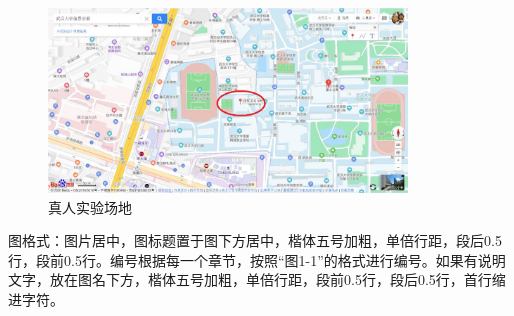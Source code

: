 \begin{figure}[h]
\centering
\includegraphics[width=0.85\textwidth]{figures/fig1.png}
\caption{真人实验场地}
\label{fig:ch1_1}
\flushleft
{}
\end{figure}

{\color{red}图格式：图片居中，图标题置于图下方居中，楷体五号加粗，单倍行距，段后0.5行，段前0.5行。编号根据每一个章节，按照“图1-1”的格式进行编号。如果有说明文字，放在图名下方，楷体五号加粗，单倍行距，段前0.5行，段后0.5行，首行缩进字符。}